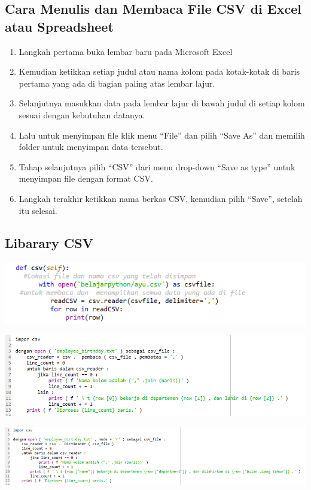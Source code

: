 \documentclass{article}
\begin{document}
\subsection{Cara Menulis dan Membaca File CSV di Excel atau Spreadsheet}
\begin{enumerate}
    \item Langkah pertama buka lembar baru pada Microsoft Excel
    \item Kemudian ketikkan setiap judul atau nama kolom pada kotak-kotak di baris pertama yang ada di bagian paling atas lembar lajur.
    \item Selanjutnya masukkan data pada lembar lajur di bawah judul di setiap kolom sesuai dengan kebutuhan datanya.
    \item Lalu untuk menyimpan file klik menu “File” dan pilih “Save As” dan memilih folder untuk menyimpan data tersebut.
    \item Tahap selanjutnya pilih “CSV” dari menu drop-down “Save as type” untuk menyimpan file dengan format CSV.
    \item Langkah terakhir ketikkan nama berkas CSV, kemudian pilih “Save”, setelah itu selesai.
\end{enumerate}

\subsection{Libarary CSV}

\begin{center}
    \includegraphics[width = 8cm\textwidth]{l1.png}
\end{center}

\begin{center}
    \includegraphics[width = 8cm\textwidth]{l2.png}
\end{center}

\begin{center}
    \includegraphics[width = 8cm\textwidth]{l3.png}
\end{center}
\end{document}
